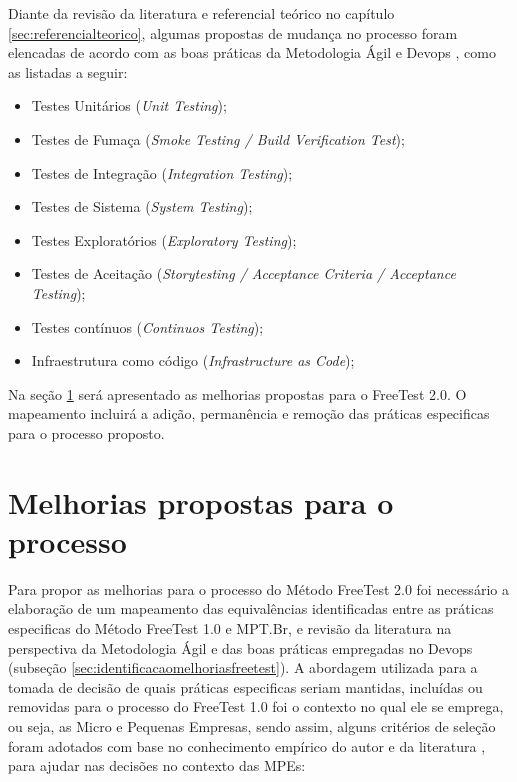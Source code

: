 Diante da revisão da literatura e referencial teórico no capítulo \ref{sec:referencialteorico}, algumas propostas de mudança no processo foram elencadas de acordo com as boas práticas da Metodologia Ágil \cite{Beck2001,Debois2008} e Devops \cite{Howlett,Fitzgerald2014,Erich2014}, como as listadas a seguir:

\begin{itemize}
    \item Testes Unitários (\textit{Unit Testing});
    \item Testes de Fumaça (\textit{Smoke Testing / Build Verification Test});
    \item Testes de Integração (\textit{Integration Testing});
    \item Testes de Sistema (\textit{System Testing});
    \item Testes Exploratórios (\textit{Exploratory Testing});
    \item Testes de Aceitação (\textit{Storytesting / Acceptance Criteria / Acceptance Testing});
    \item Testes contínuos (\textit{Continuos Testing});
    \item Infraestrutura como código (\textit{Infrastructure as Code})\cite{BRAGA2015};
\end{itemize}

Na seção \ref{sec:melhoriaspropostas} será apresentado as melhorias propostas para o FreeTest 2.0. O mapeamento incluirá a adição, permanência e remoção das práticas especificas para o processo proposto.

\section{Melhorias propostas para o processo}
\label{sec:melhoriaspropostas}

Para propor as melhorias para o processo do Método FreeTest 2.0 foi necessário a elaboração de um mapeamento das equivalências identificadas entre as práticas especificas do Método FreeTest 1.0 e MPT.Br, e revisão da literatura na perspectiva da Metodologia Ágil e das boas práticas empregadas no Devops (subseção \ref{sec:identificacaomelhoriasfreetest}).
A abordagem utilizada para a tomada de decisão de quais práticas especificas seriam mantidas, incluídas ou removidas para o processo do FreeTest 1.0 foi o contexto no qual ele se emprega, ou seja, as Micro e Pequenas Empresas, sendo assim, alguns critérios de seleção foram adotados com base no conhecimento empírico do autor e da literatura \cite{JamesWhittakerJasonCarollo2012, Especialistas2015, Whittaker2009, ABESSofftware2014, FelipeDreher2016, Laporte2010, Ramachandram2008, SilvaDias2015}, para ajudar nas decisões no contexto das MPEs:


